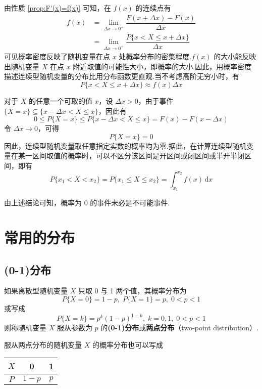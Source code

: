 由性质 \ref*{prop:F'(x)=f(x)} 可知，在 $f(x)$ 的连续点有
$$
\begin{aligned}
    f(x) &= \lim_{\Delta x \to 0^+} \dfrac{F(x + \Delta x)-F(x)}{\Delta x}\\
    &= \lim_{\Delta x \to 0^+} \dfrac{P\{x < X \leqslant x + \Delta x\}}{\Delta x}
\end{aligned}
$$
可见概率密度反映了随机变量在点 $x$ 处概率分布的密集程度.$f(x)$ 的大小能反映出随机变量 $X$ 在点 $x$ 附近取值的可能性大小，即概率的大小.因此，用概率密度描述连续型随机变量的分布比用分布函数更直观.当不考虑高阶无穷小时，有
$$
P\{x < X \leqslant x + \Delta x\} \approx f(x) \Delta x
$$

对于 $X$ 的任意一个可取的值 $x$，设 $\Delta x > 0$，由于事件 $\{X=x\} \subseteq \{x - \Delta x < X \leqslant x\}$，因此有
$$
0 \leqslant P\{X=x\} \leqslant P\{x - \Delta x < X \leqslant x\} = F(x)-F(x-\Delta x)
$$
令 $\Delta x \to 0$，可得
$$
P\{X=x\}=0
$$
因此，连续型随机变量取任意指定实数的概率均为零.据此，在计算连续型随机变量在某一区间取值的概率时，可以不区分该区间是开区间或闭区间或半开半闭区间，即有
$$
P\{x_1 < X < x_2\} = P\{x_1 \leqslant X \leqslant x_2\} = \int_{x_1}^{x_2} f(x)\,\text{d}x
$$

由上述结论可知，概率为 0 的事件未必是不可能事件.

\section{常用的分布}

\subsection{(0-1)分布}

\begin{definition}
    如果离散型随机变量 $X$ 只取 0 与 1 两个值，其概率分布为
    $$
    P\{X=0\}=1-p, \; P\{X=1\}=p, \; 0<p<1
    $$
    或写成
    $$
    P\{X=k\}=p^k (1-p)^{1-k}, \; k=0,1, \; 0<p<1
    $$
    则称随机变量 $X$ 服从参数为 $p$ 的\textbf{(0-1)分布}或\textbf{两点分布}（two-point distribution）.
\end{definition}

服从两点分布的随机变量 $X$ 的概率分布也可以写成
\begin{table*}[htbp]
    \centering

    \begin{tabular}{c | c c}
        \hline
        $X$ & 0 & 1 \\
        \hline
        $P$ & $1-p$ & $p$ \\
        \hline
    \end{tabular}
\end{table*}

